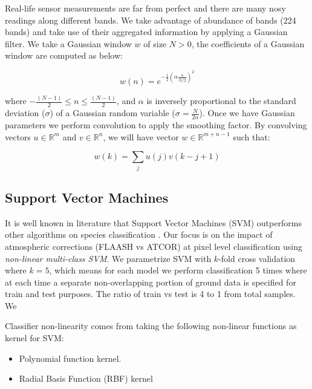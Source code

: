 \documentclass[remotesensing,article,accept,moreauthors,pdftex,12pt,a4paper]{mdpi}
\begin{document}
Real-life sensor measurements are far from perfect and there are many nosy readings along different bands. 
We take advantage of abundance of bands (224 bands) and take use of their aggregated information by applying a Gaussian filter. 
We take a Gaussian window $w$ of size $N > 0$, the coefficients of a Gaussian window are computed as below:

\begin{equation}
w(n) = e^{-\frac{1}{2}(\alpha \frac{n}{N/2})^2}
\end{equation}  

where $-\frac{(N-1)}{2} \leq n \leq \frac{(N-1)}{2}$, and $\alpha$ is inversely proportional to the standard deviation ($\sigma$) of a Gaussian random variable ($\sigma = \frac{N}{2\alpha}$). 
Once we have Gaussian parameters we perform convolution to apply the smoothing factor. 
By convolving vectors $u \in \mathbb{R}^m$ and $v\in \mathbb{R}^n$, we will have vector $w\in \mathbb{R}^{m+n-1}$ such that: 

\begin{equation}
w(k)=\sum_j u(j)v(k-j+1)
\end{equation} 


\subsection{Support Vector Machines}

It is well known in literature that Support Vector Machines (SVM) outperforms other algorithms on species classification \cite{colgan2012mapping, baldeck2014landscape, cho2012mapping}. 
Our focus is on the impact of atmospheric corrections (FLAASH vs ATCOR) at pixel level classification using \textit{non-linear multi-class SVM}. 
We parametrize SVM with $k$-fold cross validation where $k=5$, which means for each model we perform classification 5 times where at each time a separate non-overlapping portion of ground data is specified for train and test purposes. 
The ratio of train vs test is 4 to 1 from total samples.
We 


Classifier non-linearity comes from taking the following non-linear functions as kernel for SVM: 

\begin{itemize}
\item Polynomial function kernel.
\item Radial Basis Function (RBF) kernel
\end{itemize}
\end{document}
